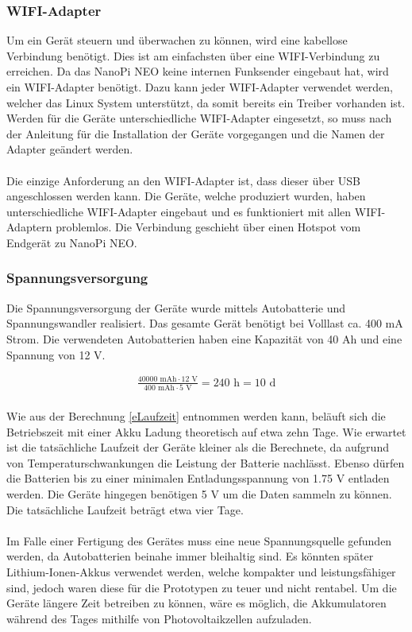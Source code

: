 \subsubsection{WIFI-Adapter}
Um ein Gerät steuern und überwachen zu können, wird eine kabellose Verbindung benötigt. Dies ist am einfachsten über eine WIFI-Verbindung zu erreichen. Da das NanoPi NEO keine internen Funksender eingebaut hat, wird ein WIFI-Adapter benötigt. Dazu kann jeder WIFI-Adapter verwendet werden, welcher das Linux System unterstützt, da somit bereits ein Treiber vorhanden ist. Werden für die Geräte unterschiedliche WIFI-Adapter eingesetzt, so muss nach der Anleitung für die Installation der Geräte vorgegangen und die Namen der Adapter geändert werden.\\\\
Die einzige Anforderung an den WIFI-Adapter ist, dass dieser über USB angeschlossen werden kann. Die Geräte, welche produziert wurden, haben unterschiedliche WIFI-Adapter eingebaut und es funktioniert mit allen WIFI-Adaptern problemlos. Die Verbindung geschieht über einen Hotspot vom Endgerät zu NanoPi NEO.

\subsubsection{Spannungsversorgung}
Die Spannungsversorgung der Geräte wurde mittels Autobatterie und Spannungswandler realisiert. Das gesamte Gerät benötigt bei Volllast ca. 400 mA Strom. Die verwendeten Autobatterien haben eine Kapazität von 40 Ah und eine Spannung von 12 V.

\begin{equation}
\begin{split}
\frac { 40000\text{ mAh}\cdot 12 \text{ V} }{ 400 \text{ mAh} \cdot 5 \text{ V} } = 240 \text{ h}= 10 \text{ d} \\
\label{eLaufzeit}
\end{split}
\end{equation}

Wie aus der Berechnung \eqref{eLaufzeit} entnommen werden kann, beläuft sich die Betriebszeit mit einer Akku Ladung theoretisch auf etwa zehn Tage. Wie erwartet ist die tatsächliche Laufzeit der Geräte kleiner als die Berechnete, da aufgrund von Temperaturschwankungen die Leistung der Batterie nachlässt. Ebenso dürfen die Batterien bis zu einer minimalen Entladungsspannung von 1.75 V \cite{bleiakku} entladen werden. Die Geräte hingegen benötigen 5 V um die Daten sammeln zu können. Die tatsächliche Laufzeit beträgt etwa vier Tage. \\\\
Im Falle einer Fertigung des Gerätes muss eine neue Spannungsquelle gefunden werden, da Autobatterien beinahe immer bleihaltig sind. Es könnten später Lithium-Ionen-Akkus verwendet werden, welche kompakter und leistungsfähiger sind, jedoch waren diese für die Prototypen zu teuer und nicht rentabel. Um die Geräte längere Zeit betreiben zu können, wäre es möglich, die Akkumulatoren während des Tages mithilfe von Photovoltaikzellen aufzuladen.

